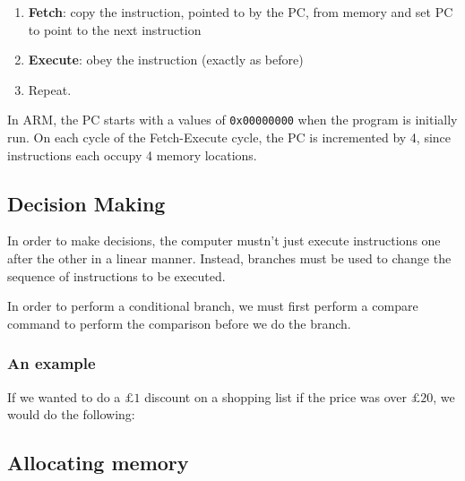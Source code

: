 \begin{enumerate}
	\item \textbf{Fetch}: copy the instruction, pointed to by the PC, from memory and set PC to point to the next instruction
	\item \textbf{Execute}:  obey the instruction (exactly as before)
	\item Repeat.
\end{enumerate}

In ARM, the PC starts with a values of \texttt{0x00000000} when the program is initially run. On each cycle of the Fetch-Execute cycle, the PC is incremented by 4, since instructions each occupy 4 memory locations.

\subsection{Decision Making}

In order to make decisions, the computer mustn't just execute instructions one after the other in a linear manner. Instead, branches must be used to change the sequence of instructions to be executed.

In order to perform a conditional branch, we must first perform a compare command to perform the comparison before we do the branch.

\subsubsection{An example}

If we wanted to do a $£1$ discount on a shopping list if the price was over $£20$, we would do the following:


\subsection{Allocating memory}

